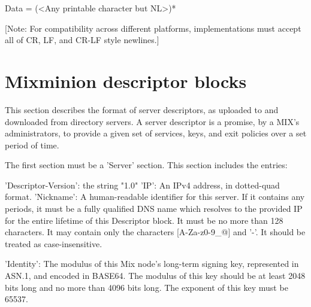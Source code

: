 Data = (<Any printable character but NL>)*

[Note: For compatibility across different platforms, implementations must
  accept all of CR, LF, and CR-LF style newlines.]

\section{Mixminion descriptor blocks}

This section describes the format of server descriptors, as uploaded
to and downloaded from directory servers.  A server descriptor is a
promise, by a MIX's administrators, to provide a given set of
services, keys, and exit policies over a set period of time.

The first section must be a 'Server' section.  This section includes
the entries:

     'Descriptor-Version':  the string "1.0"
     'IP': An IPv4 address, in dotted-quad format.
     'Nickname': A human-readable identifier for this server.  If it
         contains any periods, it must be a fully qualified DNS name
         which resolves to the provided IP for the entire lifetime of
         this Descriptor block.  It must be no more than 128
         characters.  It may contain only the characters 
         [A-Za-z0-9_@] and '-'.  It should be treated as
         case-insensitive.

     'Identity': The modulus of this Mix node's long-term signing key,
         represented in ASN.1, and encoded in BASE64.  The modulus of
         this key should be at least 2048 bits long and no more than
         4096 bits long.  The exponent of this key must be 65537.

